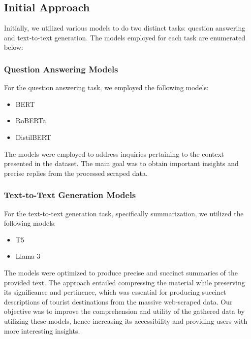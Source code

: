 \documentclass[conference]{IEEEtran}
\begin{document}
    \subsection{Initial Approach}

        Initially, we utilized various models to do two distinct tasks: question answering and text-to-text generation. The models employed for each task are enumerated below:

        \subsubsection{Question Answering Models}

        For the question answering task, we employed the following models:
        \begin{itemize}
            \item BERT
            \item RoBERTa
            \item DistilBERT
        \end{itemize}

        The models were employed to address inquiries pertaining to the context presented in the dataset. The main goal was to obtain important insights and precise replies from the processed scraped data.

        \subsubsection{Text-to-Text Generation Models}

        For the text-to-text generation task, specifically summarization, we utilized the following models:
        \begin{itemize}
            \item T5
            \item Llama-3
        \end{itemize}

        The models were optimized to produce precise and succinct summaries of the provided text. The approach entailed compressing the material while preserving its significance and pertinence, which was essential for producing succinct descriptions of tourist destinations from the massive web-scraped data.
        Our objective was to improve the comprehension and utility of the gathered data by utilizing these models, hence increasing its accessibility and providing users with more interesting insights.
\end{document}
